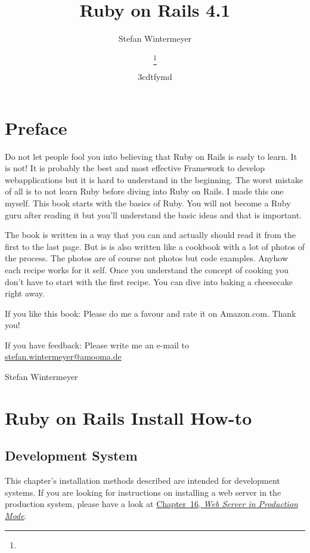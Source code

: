 \documentclass[a4paper]{book}
\title{Ruby on Rails 4.1}
\author{Stefan Wintermeyer}
\title{\textbf{\savedtitle}}
\author{\textbf{\savedauthor}\thanks{}}
\date{\w3cdtfymd}
\makeatletter
\let\savedauthor=\@author
\let\savedtitle=\@title
\newcounter{tab}[chapter]
\newcommand{\chap}[1]{\newpage\thispagestyle{empty}\chapter{#1}\label{chap:\thechapter}}
\makeatother
\begin{document}
\frontmatter
\maketitle
\thispagestyle{empty}
\setcounter{tocdepth}{4}
\tableofcontents\newpage\thispagestyle{empty}

\mainmatter
\fancyhf{}
\fancyhead[LE]{{\small\leftmark}}
\fancyhead[RO]{{\small\rightmark}}
\fancyhead[RE,LO]{{\small\savedauthor\hspace*{1ex}\textbf{\savedtitle}}}
\fancyfoot[LE,RO]{\small\textbf\thepage}
\pagestyle{fancy}

\chap{Preface}\label{preface}

Do not let people fool you into believing that Ruby on Rails is easly to learn. It is not! It is probably the best and most effective Framework to develop webapplications but it is hard to understand in the beginning. The worst mistake of all is to not learn Ruby before diving into Ruby on Rails. I made this one myself. This book starts with the basics of Ruby. You will not become a Ruby guru after reading it but you'll understand the basic ideas and that is important.

The book is written in a way that you can and actually should read it from the first to the last page. But is is also written like a cookbook with a lot of photos of the process. The photos are of course not photos but code examples. Anyhow each recipe works for it self. Once you understand the concept of cooking you don't have to start with the first recipe. You can dive into baking a cheesecake right away.

If you like this book: Please do me a favour and rate it on Amazon.com. Thank you!

If you have feedback: Please write me an e-mail to \href{mailto:stefan.wintermeyer@amooma.de}{stefan.wintermeyer@amooma.de}

Stefan Wintermeyer

\chap{Ruby on Rails Install How-to}\label{ruby-on-rails-install-how-to}

\section{Development System}\label{development-system}

This chapter's installation methods described are intended for development systems. If you are looking for instructions on installing a web server in the production system, please have a look at \hyperref[railsux5fproductionux5fwebserver]{Chapter~16, \emph{Web Server in Production Mode}}.
\end{document}
